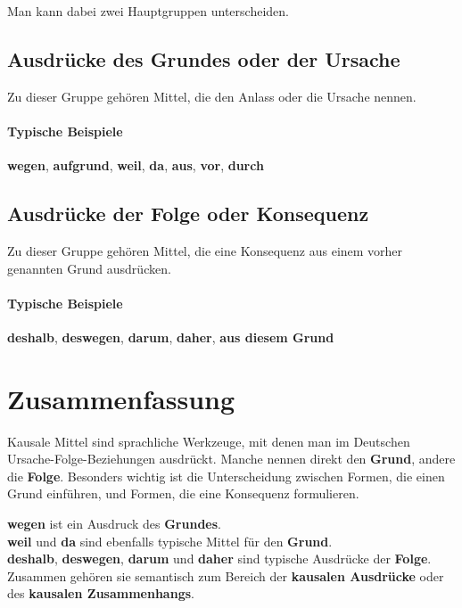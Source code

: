 \documentclass[a4paper]{article}
\begin{document}
    Man kann dabei zwei Hauptgruppen unterscheiden.
    
    \subsection{Ausdrücke des Grundes oder der Ursache}
        Zu dieser Gruppe gehören Mittel, die den Anlass oder die Ursache nennen.
        
        \paragraph{Typische Beispiele}
            \textbf{wegen}, \textbf{aufgrund}, \textbf{weil}, \textbf{da}, \textbf{aus}, \textbf{vor}, \textbf{durch}
    
    \subsection{Ausdrücke der Folge oder Konsequenz}
    Zu dieser Gruppe gehören Mittel, die eine Konsequenz aus einem vorher genannten Grund ausdrücken.
    
    \paragraph{Typische Beispiele}
        \textbf{deshalb}, \textbf{deswegen}, \textbf{darum}, \textbf{daher}, \textbf{aus diesem Grund}
    
    
    \section{Zusammenfassung}
    Kausale Mittel sind sprachliche Werkzeuge, mit denen man im Deutschen Ursache-Folge-Beziehungen ausdrückt. Manche nennen direkt den \textbf{Grund}, andere die \textbf{Folge}. Besonders wichtig ist die Unterscheidung zwischen Formen, die einen Grund einführen, und Formen, die eine Konsequenz formulieren.
    
    \textbf{wegen} ist ein Ausdruck des \textbf{Grundes}.\\
    \textbf{weil} und \textbf{da} sind ebenfalls typische Mittel für den \textbf{Grund}.\\
    \textbf{deshalb}, \textbf{deswegen}, \textbf{darum} und \textbf{daher} sind typische Ausdrücke der \textbf{Folge}.\\
    Zusammen gehören sie semantisch zum Bereich der \textbf{kausalen Ausdrücke} oder des \textbf{kausalen Zusammenhangs}.

%
%
\end{document}
